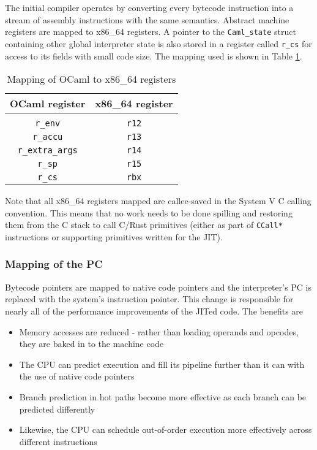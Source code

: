 The initial compiler operates by converting every bytecode instruction into a stream of assembly
instructions with the same semantics. Abstract machine registers are mapped to x86\_64 registers. A
pointer to the \texttt{Caml\_state} struct containing other global interpreter state is also
stored in a register called \texttt{r\_cs} for access to its fields with small code size. The
mapping used is shown in Table \ref{table:regmap}.

\begin{table}[h]
      \centering
      \begin{tabular}{cc}\toprule
            OCaml register          & x86\_64 register \\
            \midrule                                   \\
            \texttt{r\_env}         & \texttt{r12}     \\
            \texttt{r\_accu}        & \texttt{r13}     \\
            \texttt{r\_extra\_args} & \texttt{r14}     \\
            \texttt{r\_sp}          & \texttt{r15}     \\
            \texttt{r\_cs}          & \texttt{rbx}     \\
            \bottomrule
      \end{tabular}

      \caption{Mapping of OCaml to x86\_64 registers}
      \label{table:regmap}
\end{table}

Note that all x86\_64 registers mapped are callee-saved in the System V C calling convention. This
means that no work needs to be done spilling and restoring them from the C stack to call C/Rust
primitives (either as part of \texttt{CCall*} instructions or supporting primitives written for the
JIT).

\subsubsection{Mapping of the PC}

Bytecode pointers are mapped to native code pointers and the interpreter's PC is replaced with the
system's instruction pointer. This change is responsible for nearly all of the performance
improvements of the JITed code. The benefits are

\begin{itemize}
      \item Memory accesses are reduced - rather than loading operands and opcodes, they are baked
            in to the machine code
      \item The CPU can predict execution and fill its pipeline further than it can with the use of
            native code pointers
      \item Branch prediction in hot paths become more effective as each branch can be predicted
            differently
      \item Likewise, the CPU can schedule out-of-order execution more effectively across different
            instructions
\end{itemize}

